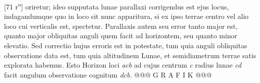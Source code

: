 [71 r\textsuperscript{o}] oriretur; ideo supputata lunae\protect{} parallaxi\protect{} corrigendus est ejus locus, indagandumque quo in loco sit nunc apparitura, si ex ipso terrae centro vel alio loco cui verticalis est, spectetur. Parallaxis\protect{} autem seu error tanto major est, quanto major obliquitas anguli quem facit ad horizontem, seu quanto minor elevatio. Sed correctio  hujus erroris est in potestate, tum quia anguli  obliquitas observatione data est, tum quia altitudinem Lunae\protect{}, et semidiametrum terrae satis explorata habemus. Esto Horizon loci \textit{acb} ad cujus centrum \textit{c} radius lunae\protect{} \textit{cd} facit angulum observatione cognitum \textit{dcb}. @@@ G R A F I K @@@%
